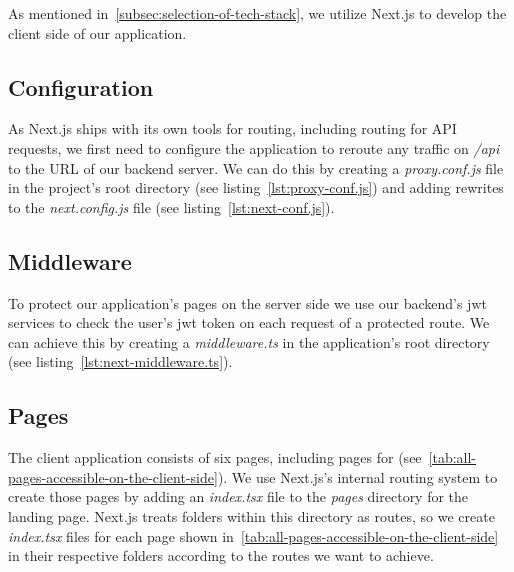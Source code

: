 As mentioned in~\cref{subsec:selection-of-tech-stack}, we utilize Next.js to develop the client side of our application.

\subsection{Configuration}\label{subsec:configuration}

As Next.js ships with its own tools for routing, including routing for \gls{API} requests, we first need to configure the application to reroute any traffic on \emph{/api} to the \gls{URL} of our backend server.
We can do this by creating a \emph{proxy.conf.js} file in the project's root directory (see listing~\ref{lst:proxy-conf.js}) and adding rewrites to the \emph{next.config.js} file (see listing~\ref{lst:next-conf.js}).


\subsection{Middleware}\label{subsec:middleware}

To protect our application's pages on the server side we use our backend's jwt services to check the user's jwt token on each request of a protected route.
We can achieve this by creating a \emph{middleware.ts} in the application's root directory (see listing~\ref{lst:next-middleware.ts}).


\subsection{Pages}\label{subsec:pages}

The client application consists of six pages, including pages for  (see~\cref{tab:all-pages-accessible-on-the-client-side}).
We use Next.js's internal routing system to create those pages by adding an \emph{index.tsx} file to the \emph{pages} directory for the landing page.
Next.js treats folders within this directory as routes, so we create \emph{index.tsx} files for each page shown in~\cref{tab:all-pages-accessible-on-the-client-side} in their respective folders according to the routes we want to achieve.

